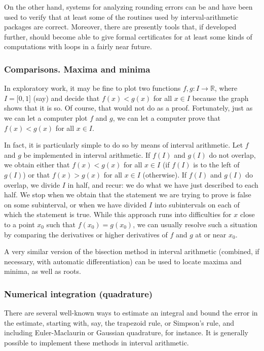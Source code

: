   On the other hand, systems for analyzing rounding errors can be and have been
  used to verify
  that at least some of the routines used by interval-arithmetic packages are
  correct. Moreover, there are presently tools that, if developed
  further, should become able to give formal certificates for at least some
  kinds of computations with loops in a fairly near future.
  
\subsubsection{Comparisons. Maxima and minima}

In exploratory work, it may be fine to plot two functions
$f,g:I\to \mathbb{R}$, where $I=\lbrack 0,1\rbrack$ (say) and decide that $f(x)<g(x)$ for all $x\in I$
because the graph shows that it is so. Of course,
that would not do as a proof. Fortunately, just as we can let a computer plot
$f$ and $g$, we can let a computer prove that $f(x)<g(x)$ for all $x\in I$.

In fact, it is particularly simple to do so by means of interval arithmetic.
Let $f$ and $g$ be implemented in interval arithmetic. If $f(I)$ and $g(I)$
do not overlap, we obtain either that $f(x)<g(x)$ for all $x\in I$ (if $f(I)$
is to the left of $g(I)$) or that $f(x)>g(x)$ for all $x\in I$ (otherwise).
If $f(I)$ and $g(I)$ do overlap, we divide $I$ in half, and recur:
we do what we have just described
to each half. We stop when we obtain that the statement we are trying to prove
is false on some subinterval, or when we have divided $I$ into subintervals
on each of which the statement is true. While this approach runs into
difficulties for $x$ close to a point $x_0$ such that $f(x_0)=g(x_0)$, we can
usually resolve such a situation by comparing the derivatives or higher
derivatives of $f$ and $g$ at or near $x_0$.

A very similar version of the bisection method in interval arithmetic
(combined, if necessary, with automatic differentiation)
can be used to locate maxima and minima, as well as roots.

\subsubsection{Numerical integration (quadrature)}

There are several well-known ways to estimate an integral and bound the error
in the estimate, starting with, say, the trapezoid rule, or Simpson's rule,
and including Euler-Maclaurin or Gaussian quadrature, for instance.
It is generally possible to implement these methods in interval arithmetic.

